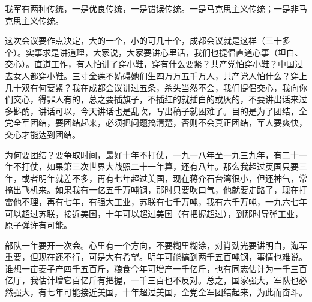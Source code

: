 我军有两种传统，一是优良传统，一是错误传统。一是马克思主义传统；一是非马克思主义传统。

这次会议要作点决定，大的一个，小的可几十个，成都会议就是这样（三十多个）。实事求是讲道理，大家说，大家要讲心里话，我们也提倡直道心事（坦白、交心）。直道工作，有人怕讲了穿小鞋，穿有什么要紧？共产党怕穿小鞋？中国过去女人都穿小鞋。三寸金莲不妨碍她们生四万万五千万人，共产党人怕什么？穿上几十双有何要紧？我在成都会议讲过五条，杀头当然不会，我们提倡交心，我向你们交心，得罪人有的，总之要插旗子，不插红的就插白的或灰的，不要讲出话来过多斟酌，讲话可以，今天讲话也是乱吹，写出稿子就困难了。目的是为了团结，全党全军团结，要团结起来，必须把问题搞清楚，否则不会真正团结，军人要爽快，交心才能达到团结。

为何要团结？要争取时间，最好十年不打仗，一九一八年至一九三九年，有二十一年不打仗，如果第三次世界大战照二十一年算，还有八年。那么我超过英国只要三年，或者明年就差不多，再有七年超过美国，现在蒋介石台湾很小，但还神气，常搞出飞机来。如果我有一亿五千万吨钢，那时只要吹口气，他就要走路了，现在打雷他不理，再有七年，有强大工业，苏联有七千万吨，我有六千万吨，一九六七年可以超过苏联，接近美国，十年可以超过美国（有把握超过），到那时导弹工业，原子弹许有可能。

部队一年要开一次会。心里有一个方向，不要糊里糊涂，对肖劲光要讲明白，海军重要，但现在还不行，可是大有希望。明年可能搞到两千五百吨钢，事情也难说。谁想一亩麦子产四千五百斤，粮食今年可增产一千亿斤，也有同志估计为一千三百亿厅，我估计增它百亿斤有把握，一千三百也不反对。总之，国家强大，军队也必然强大，有七年可能接近美国，十年超过美国，全党全军团结起来，为此而奋斗。


